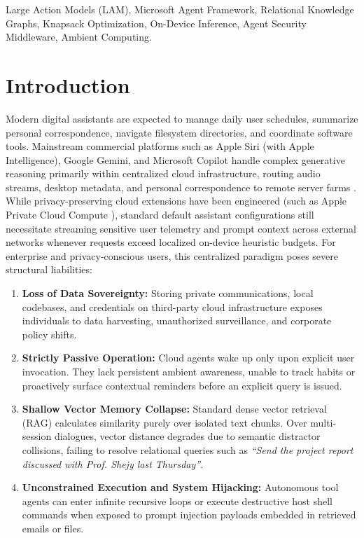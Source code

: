 \documentclass[conference,a4paper]{IEEEtran}
\begin{document}
\begin{IEEEkeywords}
Large Action Models (LAM), Microsoft Agent Framework, Relational Knowledge Graphs, Knapsack Optimization, On-Device Inference, Agent Security Middleware, Ambient Computing.
\end{IEEEkeywords}

\section{Introduction}

Modern digital assistants are expected to manage daily user schedules, summarize personal correspondence, navigate filesystem directories, and coordinate software tools. Mainstream commercial platforms such as Apple Siri (with Apple Intelligence), Google Gemini, and Microsoft Copilot handle complex generative reasoning primarily within centralized cloud infrastructure, routing audio streams, desktop metadata, and personal correspondence to remote server farms \cite{apple2024pcc, google2024geminiprivacy, microsoft2024copilotprivacy}. While privacy-preserving cloud extensions have been engineered (such as Apple Private Cloud Compute \cite{apple2024pcc}), standard default assistant configurations still necessitate streaming sensitive user telemetry and prompt context across external networks whenever requests exceed localized on-device heuristic budgets. For enterprise and privacy-conscious users, this centralized paradigm poses severe structural liabilities:
\begin{enumerate}
    \item \textbf{Loss of Data Sovereignty:} Storing private communications, local codebases, and credentials on third-party cloud infrastructure exposes individuals to data harvesting, unauthorized surveillance, and corporate policy shifts.
    \item \textbf{Strictly Passive Operation:} Cloud agents wake up only upon explicit user invocation. They lack persistent ambient awareness, unable to track habits or proactively surface contextual reminders before an explicit query is issued.
    \item \textbf{Shallow Vector Memory Collapse:} Standard dense vector retrieval (RAG) calculates similarity purely over isolated text chunks. Over multi-session dialogues, vector distance degrades due to semantic distractor collisions, failing to resolve relational queries such as \textit{``Send the project report discussed with Prof. Shejy last Thursday''}.
    \item \textbf{Unconstrained Execution and System Hijacking:} Autonomous tool agents can enter infinite recursive loops or execute destructive host shell commands when exposed to prompt injection payloads embedded in retrieved emails or files.
\end{enumerate}
\end{document}
